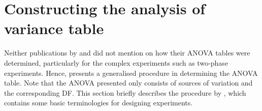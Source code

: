 \documentclass[11pt,a4paper]{article}
\begin{document}



\section{Constructing the analysis of variance table}
Neither publications by \cite{McIntyre1955} and \cite{Curnow1959} did not mention on how their ANOVA tables were determined, particularly for the complex experiments such as two-phase experiments. Hence, \cite{Brien1983} presents a generalised procedure in determining the ANOVA table. Note that the ANOVA presented only consists of sources of variation and the corresponding DF. This section briefly describes the procedure by \cite{Brien1983}, which contains some basic terminologies for designing experiments.
\end{document}
